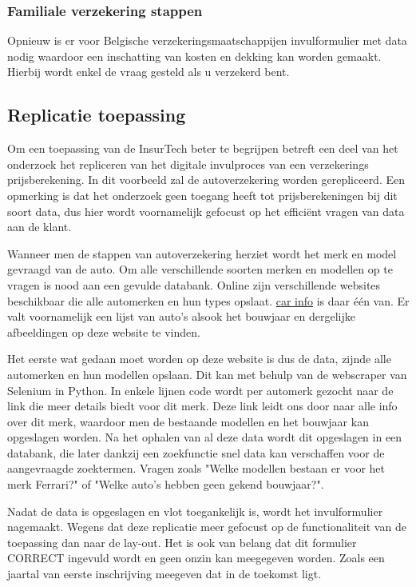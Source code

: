 \subsubsection{Familiale verzekering stappen}
Opnieuw is er voor Belgische verzekeringsmaatschappijen invulformulier met data nodig waardoor een inschatting van kosten en dekking kan worden gemaakt.
Hierbij wordt enkel de vraag gesteld als u verzekerd bent.


\subsection{Replicatie toepassing}
Om een toepassing van de InsurTech beter te begrijpen betreft een deel van het onderzoek het repliceren van het digitale invulproces van een verzekerings prijsberekening.
In dit voorbeeld zal de autoverzekering worden gerepliceerd.
Een opmerking is dat het onderzoek geen toegang heeft tot prijsberekeningen bij dit soort data, dus hier wordt voornamelijk gefocust op het efficiënt vragen van data aan de klant.

Wanneer men de stappen van autoverzekering herziet wordt het merk en model gevraagd van de auto.
Om alle verschillende soorten merken en modellen op te vragen is nood aan een gevulde databank.
Online zijn verschillende websites beschikbaar die alle automerken en hun types opslaat.
\href{https://www.car.info/en-se/brands}{car info} is daar één van.
Er valt voornamelijk een lijst van auto's alsook het bouwjaar en dergelijke afbeeldingen op deze website te vinden.

Het eerste wat gedaan moet worden op deze website is dus de data, zijnde alle automerken en hun modellen opslaan.
Dit kan met behulp van de webscraper van Selenium in Python.
In enkele lijnen code wordt per automerk gezocht naar de link die meer details biedt voor dit merk.
Deze link leidt ons door naar alle info over dit merk, waardoor men de bestaande modellen en het bouwjaar kan opgeslagen worden.
Na het ophalen van al deze data wordt dit opgeslagen in een databank, die later dankzij een zoekfunctie snel data kan verschaffen voor de aangevraagde zoektermen.
Vragen zoals "Welke modellen bestaan er voor het merk Ferrari?" of "Welke auto's hebben geen gekend bouwjaar?".

Nadat de data is opgeslagen en vlot toegankelijk is, wordt het invulformulier nagemaakt.
Wegens dat deze replicatie meer gefocust op de functionaliteit van de toepassing dan naar de lay-out.
Het is ook van belang dat dit formulier CORRECT ingevuld wordt en geen onzin kan meegegeven worden.
Zoals een jaartal van eerste inschrijving meegeven dat in de toekomst ligt.

